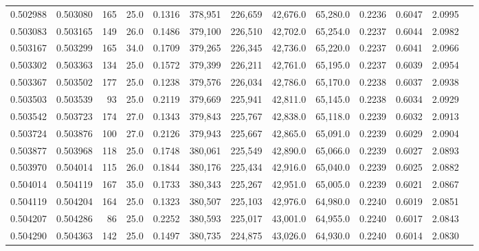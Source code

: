 \begin{tabular}{rrrrrrrrrrrrr}
0.502988 & 0.503080 &   165 & 25.0 &                                     0.1316 & 378,951 & 226,659 &  42,676.0 &  65,280.0 & 0.2236 & 0.6047 & 2.0995 \\
0.503083 & 0.503165 &   149 & 26.0 &                                     0.1486 & 379,100 & 226,510 &  42,702.0 &  65,254.0 & 0.2237 & 0.6044 & 2.0982 \\
0.503167 & 0.503299 &   165 & 34.0 &                                     0.1709 & 379,265 & 226,345 &  42,736.0 &  65,220.0 & 0.2237 & 0.6041 & 2.0966 \\
0.503302 & 0.503363 &   134 & 25.0 &                                     0.1572 & 379,399 & 226,211 &  42,761.0 &  65,195.0 & 0.2237 & 0.6039 & 2.0954 \\
0.503367 & 0.503502 &   177 & 25.0 &                                     0.1238 & 379,576 & 226,034 &  42,786.0 &  65,170.0 & 0.2238 & 0.6037 & 2.0938 \\
0.503503 & 0.503539 &    93 & 25.0 &                                     0.2119 & 379,669 & 225,941 &  42,811.0 &  65,145.0 & 0.2238 & 0.6034 & 2.0929 \\
0.503542 & 0.503723 &   174 & 27.0 &                                     0.1343 & 379,843 & 225,767 &  42,838.0 &  65,118.0 & 0.2239 & 0.6032 & 2.0913 \\
0.503724 & 0.503876 &   100 & 27.0 &                                     0.2126 & 379,943 & 225,667 &  42,865.0 &  65,091.0 & 0.2239 & 0.6029 & 2.0904 \\
0.503877 & 0.503968 &   118 & 25.0 &                                     0.1748 & 380,061 & 225,549 &  42,890.0 &  65,066.0 & 0.2239 & 0.6027 & 2.0893 \\
0.503970 & 0.504014 &   115 & 26.0 &                                     0.1844 & 380,176 & 225,434 &  42,916.0 &  65,040.0 & 0.2239 & 0.6025 & 2.0882 \\
0.504014 & 0.504119 &   167 & 35.0 &                                     0.1733 & 380,343 & 225,267 &  42,951.0 &  65,005.0 & 0.2239 & 0.6021 & 2.0867 \\
0.504119 & 0.504204 &   164 & 25.0 &                                     0.1323 & 380,507 & 225,103 &  42,976.0 &  64,980.0 & 0.2240 & 0.6019 & 2.0851 \\
0.504207 & 0.504286 &    86 & 25.0 &                                     0.2252 & 380,593 & 225,017 &  43,001.0 &  64,955.0 & 0.2240 & 0.6017 & 2.0843 \\
0.504290 & 0.504363 &   142 & 25.0 &                                     0.1497 & 380,735 & 224,875 &  43,026.0 &  64,930.0 & 0.2240 & 0.6014 & 2.0830 \\

\end{tabular}
